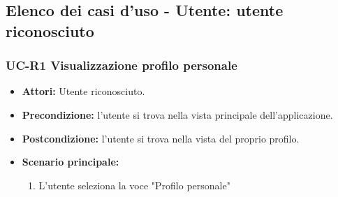 \subsection{Elenco dei casi d'uso - Utente: utente riconosciuto}
\subsubsection{UC-R1 Visualizzazione profilo personale}
\begin{itemize}
	\item \textbf{Attori:} Utente riconosciuto.
	\item \textbf{Precondizione:} l'utente si trova nella vista principale dell'applicazione.
	\item \textbf{Postcondizione:} l'utente si trova nella vista del proprio profilo.
	\item \textbf{Scenario principale:}
		\begin{enumerate}
			\item L'utente seleziona la voce "Profilo personale"
		\end{enumerate}
\end{itemize}

